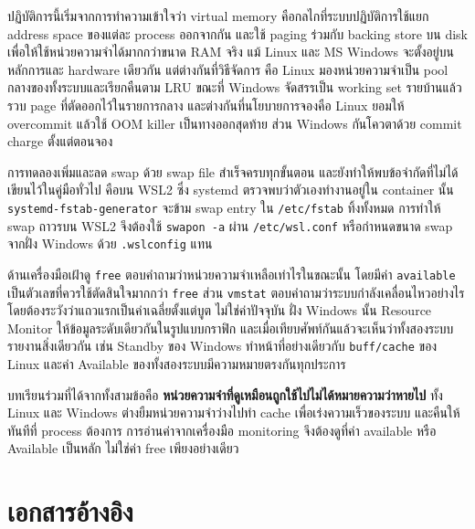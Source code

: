 \documentclass[a4paper,11pt]{article}
\newcommand{\code}[1]{\texttt{#1}}
\begin{document}
ปฏิบัติการนี้เริ่มจากการทำความเข้าใจว่า virtual memory คือกลไกที่ระบบปฏิบัติการใช้แยก address space ของแต่ละ process ออกจากกัน และใช้ paging ร่วมกับ backing store บน disk เพื่อให้ใช้หน่วยความจำได้มากกว่าขนาด RAM จริง แม้ Linux และ MS Windows จะตั้งอยู่บนหลักการและ hardware เดียวกัน แต่ต่างกันที่วิธีจัดการ คือ Linux มองหน่วยความจำเป็น pool กลางของทั้งระบบและเรียกคืนตาม LRU ขณะที่ Windows จัดสรรเป็น working set รายบ้านแล้วรวบ page ที่ตัดออกไว้ในรายการกลาง และต่างกันที่นโยบายการจองคือ Linux ยอมให้ overcommit แล้วใช้ OOM killer เป็นทางออกสุดท้าย ส่วน Windows กันโควตาด้วย commit charge ตั้งแต่ตอนจอง

การทดลองเพิ่มและลด swap ด้วย swap file สำเร็จครบทุกขั้นตอน และยังทำให้พบข้อจำกัดที่ไม่ได้เขียนไว้ในคู่มือทั่วไป คือบน WSL2 ซึ่ง systemd ตรวจพบว่าตัวเองทำงานอยู่ใน container นั้น \code{systemd-fstab-generator} จะข้าม swap entry ใน \code{/etc/fstab} ทิ้งทั้งหมด การทำให้ swap ถาวรบน WSL2 จึงต้องใช้ \code{swapon -a} ผ่าน \code{/etc/wsl.conf} หรือกำหนดขนาด swap จากฝั่ง Windows ด้วย \code{.wslconfig} แทน

ด้านเครื่องมือเฝ้าดู \code{free} ตอบคำถามว่าหน่วยความจำเหลือเท่าไรในขณะนั้น โดยมีค่า \code{available} เป็นตัวเลขที่ควรใช้ตัดสินใจมากกว่า \code{free} ส่วน \code{vmstat} ตอบคำถามว่าระบบกำลังเคลื่อนไหวอย่างไร โดยต้องระวังว่าแถวแรกเป็นค่าเฉลี่ยตั้งแต่บูต ไม่ใช่ค่าปัจจุบัน ฝั่ง Windows นั้น Resource Monitor ให้ข้อมูลระดับเดียวกันในรูปแบบกราฟิก และเมื่อเทียบศัพท์กันแล้วจะเห็นว่าทั้งสองระบบรายงานสิ่งเดียวกัน เช่น Standby ของ Windows ทำหน้าที่อย่างเดียวกับ \code{buff/cache} ของ Linux และค่า Available ของทั้งสองระบบมีความหมายตรงกันทุกประการ

บทเรียนร่วมที่ได้จากทั้งสามข้อคือ \textbf{หน่วยความจำที่ดูเหมือนถูกใช้ไปไม่ได้หมายความว่าหายไป} ทั้ง Linux และ Windows ต่างยืมหน่วยความจำว่างไปทำ cache เพื่อเร่งความเร็วของระบบ และคืนให้ทันทีที่ process ต้องการ การอ่านค่าจากเครื่องมือ monitoring จึงต้องดูที่ค่า available หรือ Available เป็นหลัก ไม่ใช่ค่า free เพียงอย่างเดียว

\section*{เอกสารอ้างอิง}
\end{document}
